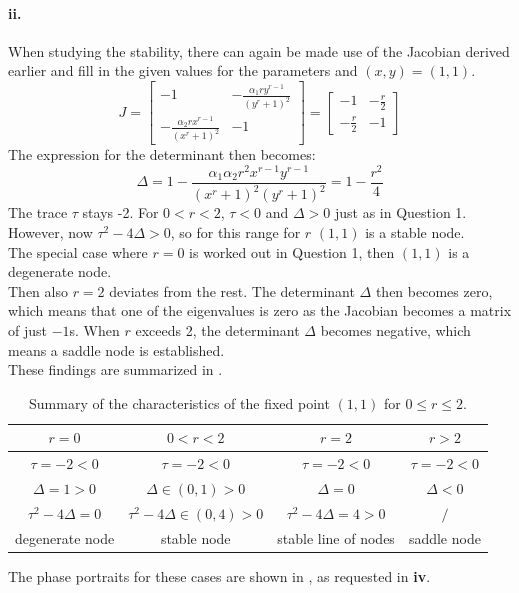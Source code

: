 \documentclass[a4paper,11pt]{article}
\begin{document}
\paragraph{ii.}\: When studying the stability, there can again be made use of the Jacobian derived earlier and
fill in the given values for the parameters and $(x,y)=(1,1)$.
\begin{equation*}
	J=
	\begin{bmatrix}
		-1 & -\frac{\alpha_1ry^{r-1}}{(y^r+1)^2}\\
		-\frac{\alpha_2rx^{r-1}}{(x^r+1)^2} & -1
	\end{bmatrix}=
	\begin{bmatrix}
		-1 & -\frac{r}{2}\\
		-\frac{r}{2} & -1
	\end{bmatrix}
\end{equation*}
The expression for the determinant then becomes:
\begin{equation*}
	\Delta=1-\frac{\alpha_1\alpha_2r^2x^{r-1}y^{r-1}}{(x^r+1)^2(y^r+1)^2}=1-\frac{r^2}{4}
\end{equation*}
The trace $\tau$ stays -2. For $0< r< 2$, $\tau<0$ and $\Delta>0$ just as in Question 1.
However, now $\tau^2-4\Delta>0$, so for this range for $r$ $(1,1)$ is a stable node.\\ The special case
where $r=0$ is worked out in Question 1, then $(1,1)$ is a degenerate node. \\
Then also $r=2$ deviates from the rest. The determinant $\Delta$ then becomes zero, which means that one
of the eigenvalues is zero as the Jacobian becomes a matrix of just $-1$s. When $r$ exceeds 2, the determinant
$\Delta$ becomes negative, which means a saddle node is established.\\
These findings are summarized in .
\begin{table}[H]
	\centering
	\begin{tabular}{|c|c|c|c|}
	\hline
	$r=0$ & $0<r<2$ & $r=2$ & $r>2$\\
	\hline
	$\tau=-2<0$ & $\tau=-2<0$ & $\tau=-2<0$ & $\tau=-2<0$\\
	$\Delta=1>0$ & $\Delta\in(0,1)>0$ & $\Delta=0$ & $\Delta<0$\\
	$\tau^2-4\Delta=0$ & $\tau^2-4\Delta\in(0,4)>0$ & $\tau^2-4\Delta=4>0$ & $/$\\
	degenerate node & stable node & stable line of nodes & saddle node\\
	\hline
	\end{tabular}
	\captionsetup{width=0.9\textwidth}
	\caption{Summary of the characteristics of the fixed point $(1,1)$ for $0\leq r\leq2$.}
	\label{tbeq2}
\end{table}
\vspace{-5mm}
The phase portraits for these cases are shown in , as requested in \textbf{iv}.
\vspace{-3mm}
\end{document}

